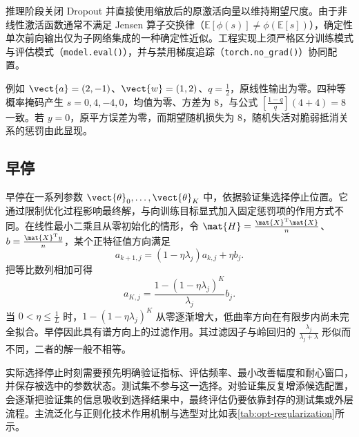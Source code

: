 \documentclass[../textbook.tex]{subfiles}
\begin{document}
推理阶段关闭 Dropout 并直接使用缩放后的原激活向量以维持期望尺度。由于非线性激活函数通常不满足 Jensen 算子交换律（$\mathbb E[\phi(s)]\ne\phi(\mathbb E[s])$），确定性单次前向输出仅为子网络集成的一种确定性近似。工程实现上须严格区分训练模式与评估模式（\texttt{model.eval()}），并与禁用梯度追踪（\texttt{torch.no\_grad()}）协同配置。

例如 $\vect{a}=(2,-1)$、$\vect{w}=(1,2)$、$q=\frac{1}{2}$，原线性输出为零。四种等概率掩码产生 $s=0,4,-4,0$，均值为零、方差为 $8$，与公式 $[\frac{1-q}{q}](4+4)=8$ 一致。若 $y=0$，原平方误差为零，而期望随机损失为 $8$，随机失活对脆弱抵消关系的惩罚由此显现。

\subsection{早停}
早停在一系列参数 $\vect{\theta}_0,\ldots,\vect{\theta}_K$ 中，依据验证集选择停止位置。它通过限制优化过程影响最终解，与向训练目标显式加入固定惩罚项的作用方式不同。在线性最小二乘且从零初始化的情形，令 $\mat{H}=\frac{\mat{X}^{\mathrm{T}}\mat{X}}{n}$、$b=\frac{\mat{X}^{\mathrm{T}}y}{n}$，某个正特征值方向满足
\begin{equation}
 a_{k+1,j}=(1-\eta\lambda_j)a_{k,j}+\eta b_j.
\end{equation}
把等比数列相加可得
\begin{equation}
 a_{K,j}=\frac{1-(1-\eta\lambda_j)^K}{\lambda_j}b_j.
\end{equation}
当 $0<\eta\leq\frac{1}{L}$ 时，$1-(1-\eta\lambda_j)^K$ 从零逐渐增大，低曲率方向在有限步内尚未完全拟合。早停因此具有谱方向上的过滤作用。其过滤因子与岭回归的 $\frac{\lambda_j}{\lambda_j+\lambda}$ 形似而不同，二者的解一般不相等。

实际选择停止时刻需要预先明确验证指标、评估频率、最小改善幅度和耐心窗口，并保存被选中的参数状态。测试集不参与这一选择。对验证集反复增添候选配置，会逐渐把验证集的信息吸收到选择结果中，最终评估仍要依靠封存的测试集或外层流程。主流泛化与正则化技术作用机制与选型对比如表\ref{tab:opt-regularization}所示。
\end{document}
